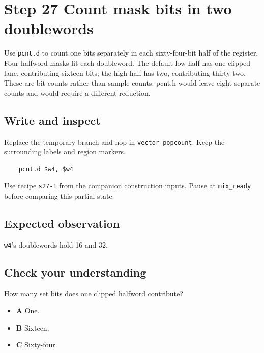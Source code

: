 \section{Step 27 Count mask bits in two doublewords}\label{pcm-s27}

Use \texttt{pcnt.d} to count one bits separately in each sixty-four-bit half of the register. Four halfword masks fit each doubleword. The default low half has one clipped lane, contributing sixteen bits; the high half has two, contributing thirty-two. These are bit counts rather than sample counts. pcnt.h would leave eight separate counts and would require a different reduction.

\subsection{Write and inspect}
Replace the temporary branch and nop in \texttt{vector\_popcount}. Keep the surrounding labels and region markers.

\begin{verbatim}
    pcnt.d $w4, $w4
\end{verbatim}
Use recipe \texttt{s27-1} from the companion construction inputs. Pause at \texttt{mix\_ready} before comparing this partial state.

\subsection{Expected observation}
\texttt{w4}’s doublewords hold 16 and 32.

\subsection{Check your understanding}
How many set bits does one clipped halfword contribute?

\begin{itemize}
  \item \textbf{A} One.
  \item \textbf{B} Sixteen.
  \item \textbf{C} Sixty-four.
\end{itemize}
